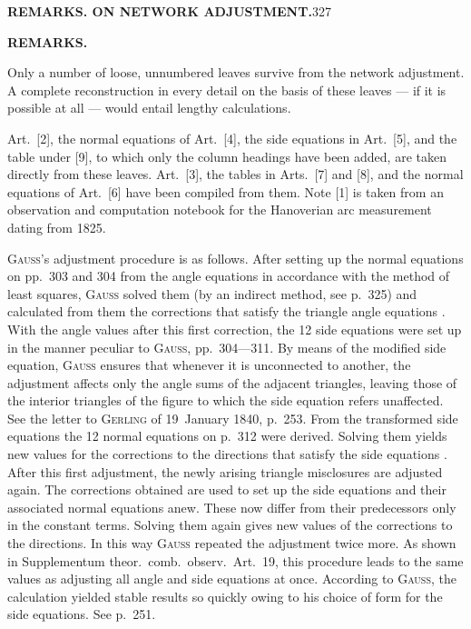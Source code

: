 \noindent\textbf{REMARKS. ON NETWORK ADJUSTMENT.}\hfill327

\begin{center}\textbf{REMARKS.}\end{center}

\par\noindent\hspace*{\parindent}Only a number of loose, unnumbered leaves survive from the network adjustment.
A complete reconstruction in every detail on the basis of these leaves
--- if it is possible at all --- would entail lengthy calculations.

\par\noindent\hspace*{\parindent}Art.~[2], the normal equations of Art.~[4], the side equations in Art.~[5],
and the table under [9], to which only the column headings have been added,
are taken directly from these leaves. Art.~[3], the tables in Arts.~[7] and [8],
and the normal equations of Art.~[6] have been compiled from them. Note [1]
is taken from an observation and computation notebook for the Hanoverian
arc measurement dating from 1825.

\par\noindent\hspace*{\parindent}\textsc{Gauss}'s adjustment procedure is as follows.
After setting up the normal equations on pp.~303 and 304 from the angle
equations in accordance with the method of least squares, \textsc{Gauss}
solved them (by an indirect method, see p.~325) and calculated from them
the corrections that satisfy the triangle angle equations .
With the angle values after this first correction, the 12 side equations
were set up in the manner peculiar to \textsc{Gauss}, pp.~304---311.
By means of the modified side equation, \textsc{Gauss} ensures that whenever
it is unconnected to another, the adjustment affects only the angle sums
of the adjacent triangles, leaving those of the interior triangles of the
figure to which the side equation refers unaffected. See the letter to
\textsc{Gerling} of 19~January 1840, p.~253. From the transformed side
equations the 12 normal equations on p.~312 were derived. Solving them
yields new values for the corrections to the directions that satisfy the
side equations . After this first adjustment, the newly
arising triangle misclosures are adjusted again. The corrections obtained
are used to set up the side equations and their associated normal equations
anew. These now differ from their predecessors only in the constant terms.
Solving them again gives new values of the corrections to the directions.
In this way \textsc{Gauss} repeated the adjustment twice more.
As shown in Supplementum theor.~comb.~observ.~Art.~19, this procedure
leads to the same values as adjusting all angle and side equations at once.
According to \textsc{Gauss}, the calculation yielded stable results so quickly
owing to his choice of form for the side equations. See p.~251.

